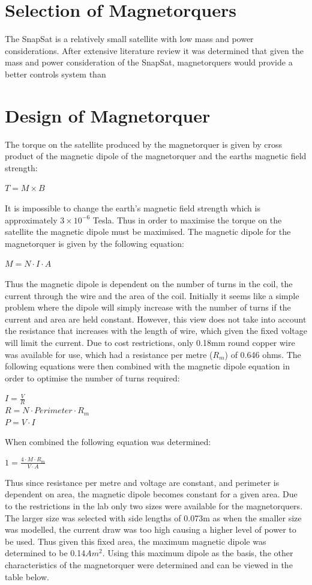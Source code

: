 \section{Selection of Magnetorquers}
The SnapSat is a relatively small satellite with low mass and power considerations.
After extensive literature review it was determined that given the mass and power consideration of the SnapSat, magnetorquers would provide a better controls system than 

\section{Design of Magnetorquer}
The torque on the satellite produced by the magnetorquer is given by cross product of the magnetic dipole of the magnetorquer and the earths magnetic field strength: 
\begin{center}
$T = M \times B$
\end{center}
It is impossible to change the earth's magnetic field strength which is approximately $3 \times 10^{-6}$ Tesla.  Thus in order to maximise the torque on the satellite the magnetic dipole must be maximised. The magnetic dipole for the magnetorquer is given by the following equation:
\begin{center}
$M = N \cdot I \cdot A$
\end{center}
Thus the magnetic dipole is dependent on the number of turns in the coil, the current through the wire and the area of the coil.  Initially it seems like a simple problem where the dipole will simply increase with the number of turns if the current and area are held constant.  However, this view does not take into account the resistance that increases with the length of wire, which given the fixed voltage will limit the current.  Due to cost restrictions, only 0.18mm round copper wire was available for use, which had a resistance per metre ($R_m$) of 0.646 ohms.  The following equations were then combined with the magnetic dipole equation in order to optimise the number of turns required:
\begin{center}
$I = \frac{V}{R}$\vspace{2mm}\\
$R = N \cdot Perimeter \cdot R_m$ \vspace{2mm}\\
$P = V \cdot I$
\end{center}
When combined the following equation was determined:
\begin{center}
$1 = \frac{4 \cdot M \cdot R_m}{V \cdot A}$
\end{center}
Thus since resistance per metre and voltage are constant, and perimeter is dependent on area, the magnetic dipole becomes constant for a given area.  Due to the restrictions in the lab only two sizes were available for the magnetorquers. The larger size was selected with side lengths of 0.073m as when the smaller size was modelled, the current draw was too high causing a higher level of power to be used.  Thus given this fixed area, the maximum magnetic dipole was determined to be  0.14$Am^2$.  Using this maximum dipole as the basis, the other characteristics of the magnetorquer were determined and can be viewed in the table below.




